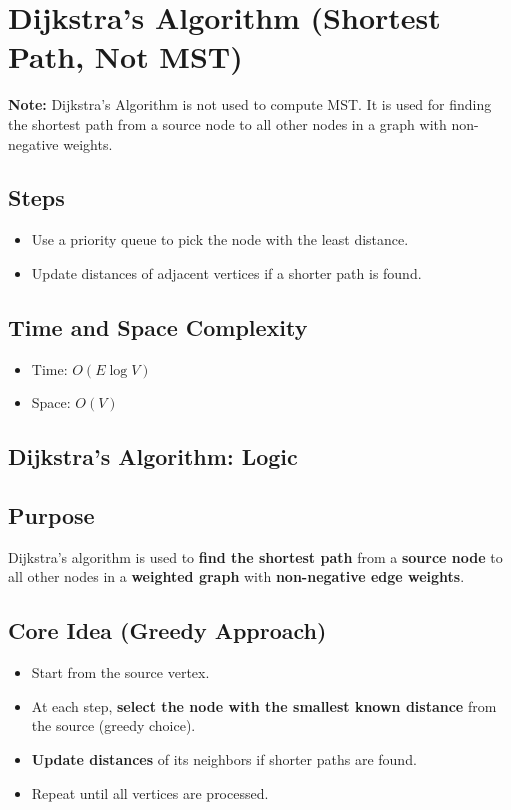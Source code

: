 \documentclass[14pt,a4paper]{extarticle}
\begin{document}
\newpage
\section{Dijkstra's Algorithm (Shortest Path, Not MST)}

\textbf{Note:} Dijkstra's Algorithm is not used to compute MST. It is used for finding the shortest path from a source node to all other nodes in a graph with non-negative weights.

\subsection*{Steps}
\begin{itemize}
    \item Use a priority queue to pick the node with the least distance.
    \item Update distances of adjacent vertices if a shorter path is found.
\end{itemize}

\subsection*{Time and Space Complexity}
\begin{itemize}
    \item Time: $O(E \log V)$
    \item Space: $O(V)$
\end{itemize}

\subsection{Dijkstra's Algorithm: Logic}
\subsection*{Purpose}
Dijkstra’s algorithm is used to \textbf{find the shortest path} from a \textbf{source node} to all other nodes in a \textbf{weighted graph} with \textbf{non-negative edge weights}.

\subsection*{Core Idea (Greedy Approach)}
\begin{itemize}
    \item Start from the source vertex.
    \item At each step, \textbf{select the node with the smallest known distance} from the source (greedy choice).
    \item \textbf{Update distances} of its neighbors if shorter paths are found.
    \item Repeat until all vertices are processed.
\end{itemize}
\end{document}
